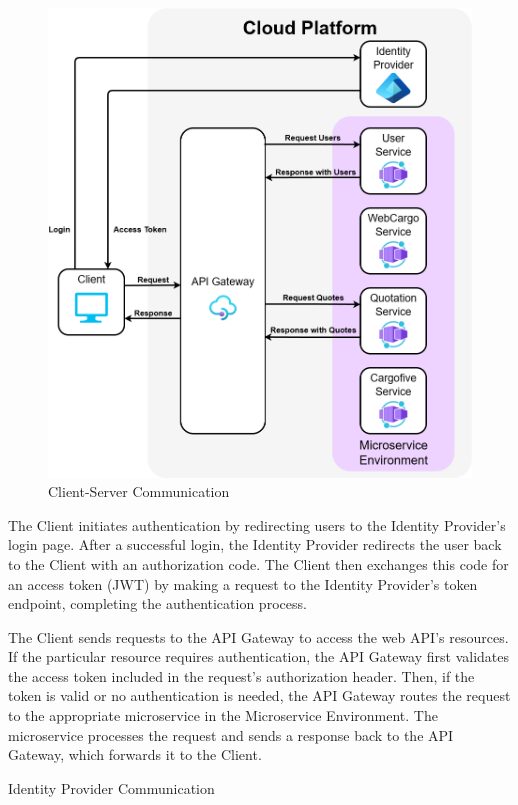 \documentclass[12pt, reqno]{amsbook}
\makeatletter
\def\subsection{\@startsection{subsection}{2}%
      \z@{.5\linespacing\@plus.7\linespacing}{.25\linespacing}%
      {\normalfont\bfseries\flushleft}}
\theoremstyle{definition}
\theoremstyle{definition}
\numberwithin{section}{chapter}
\numberwithin{table}{chapter}
\numberwithin{figure}{chapter}
\makeatother
\begin{document}
\begin{figure}[H]
  \centering
  \includegraphics[width=0.8\linewidth]{images/ClientServerCommunication.png}
  \caption{\label{Figure:ClientServerCommunication}Client-Server Communication}
\end{figure}

The Client initiates authentication by redirecting users to the Identity Provider's login page. After a successful login, the Identity Provider redirects the user back to the Client with an authorization code. The Client then exchanges this code for an access token (\ac{JWT}) by making a request to the Identity Provider's token endpoint, completing the authentication process.

The Client sends requests to the \ac{API} Gateway to access the web \ac{API}'s resources. If the particular resource requires authentication, the \ac{API} Gateway first validates the access token included in the request's authorization header. Then, if the token is valid or no authentication is needed, the \ac{API} Gateway routes the request to the appropriate microservice in the Microservice Environment. The microservice processes the request and sends a response back to the \ac{API} Gateway, which forwards it to the Client.

\subsection{Identity Provider Communication}
\end{document}

